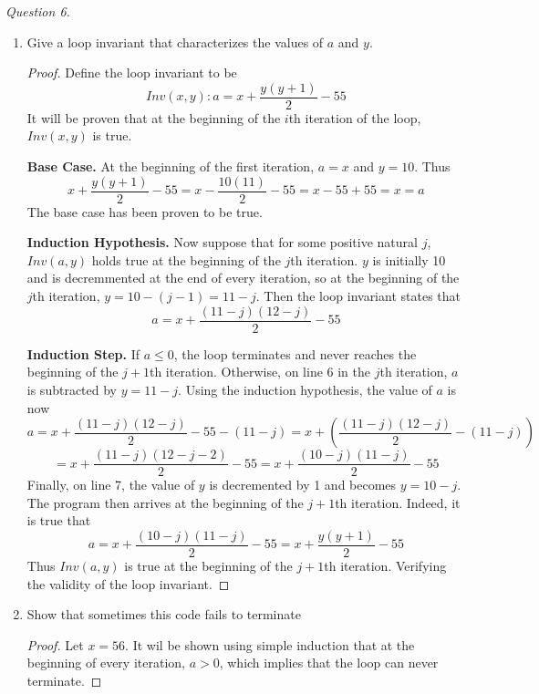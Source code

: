\documentclass[11pt]{article}
\begin{document}
    \textit{Question 6.}\begin{enumerate}
        \item Give a loop invariant that characterizes the values of \(a\) and \(y\).
        \begin{proof}
            Define the loop invariant to be
            \[
                Inv(x, y) : a = x + \frac{y(y+1)}{2} - 55
            \]
            It will be proven that at the beginning of the \(i\)th iteration of the loop, \(Inv(x,y)\) is true.

            \textbf{Base Case.} At the beginning of the first iteration, \(a=x\) and \(y=10\). Thus
            \[
                x + \frac{y(y+1)}{2} - 55 = x - \frac{10(11)}{2} - 55 = x - 55 + 55 = x = a
            \]
            The base case has been proven to be true.

            \textbf{Induction Hypothesis.} Now suppose that for some positive natural \(j\), \(Inv(a,y)\) holds true at the beginning of the \(j\)th iteration. \(y\) is initially 10 and is decremmented at the end of every iteration, so at the beginning of the \(j\)th iteration, \(y=10-(j-1) = 11 - j\). Then the loop invariant states that 
            \[
                a = x +\frac{(11-j)(12-j)}{2}-55
            \]

            \textbf{Induction Step.} If \(a \leq 0\), the loop terminates and never reaches the beginning of the \(j+1\)th iteration. Otherwise, on line 6 in the \(j\)th iteration, \(a\) is subtracted by \(y=11-j\). Using the induction hypothesis, the value of \(a\) is now
            \[
                a = x + \frac{(11-j)(12-j)}{2} - 55 - (11-j) = x + \left(\frac{(11-j)(12-j)}{2} - (11 - j)\right)
            \]
            \[
                = x+\frac{(11-j)(12-j-2)}{2}-55 = x+\frac{(10-j)(11-j)}{2}-55
            \]
            Finally, on line 7, the value of \(y\) is decremented by 1 and becomes \(y = 10-j\). The program then arrives at the beginning of the \(j+1\)th iteration. Indeed, it is true that
            \[
                a = x+\frac{(10-j)(11-j)}{2}-55 = x+\frac{y(y+1)}{2}-55
            \]
            Thus \(Inv(a,y)\) is true at the beginning of the \(j+1\)th iteration. Verifying the validity of the loop invariant.

        \end{proof}
        
        \item Show that sometimes this code fails to terminate
        \begin{proof}
            Let \(x=56\). It wil be shown using simple induction that at the beginning of every iteration, \(a > 0\), which implies that the loop can never terminate.


\end{proof}
\end{enumerate}
\end{document}
